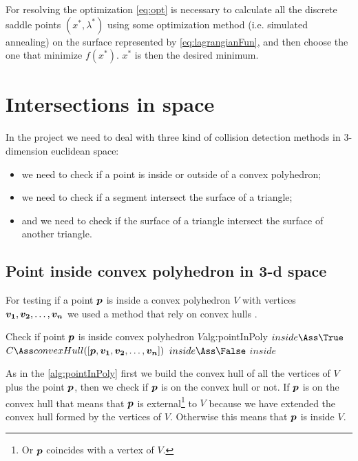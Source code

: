 \documentclass[dissertation.tex]{subfiles}
\begin{document}
For resolving the optimization \cref{eq:opt} is necessary to
calculate all the discrete saddle points $(x^*,\lambda^*)$ using some
optimization method (i.e. simulated annealing) on the surface
represented by
\cref{eq:lagrangianFun}, and then choose
the one that minimize $f(x^*)$. $x^*$ is then the desired minimum.

\section{Intersections in space}\label{sec:intersections}
In the project we need to deal with three kind of collision detection
methods in 3-dimension euclidean space:
\begin{itemize}
\item we need to check if a point is inside or outside
  of a convex polyhedron;
\item we need to check if a segment intersect the
  surface of a triangle;
\item and we need to check if the surface of a
  triangle intersect the surface of another triangle.
\end{itemize}

\subsection{Point inside convex polyhedron in 3-d space}
For testing if a point $\boldsymbol{p}$ is inside a convex polyhedron $V$ with
vertices $\boldsymbol{v_1},\boldsymbol{v_2},\dots,\boldsymbol{v_n}$ we used a method that rely
on convex hulls \cite{deberg}\cite{schneider}.

\begin{algo}{Check if point $\boldsymbol{p}$ is inside convex polyhedron $V$}{alg:pointInPoly}
  \State $inside\Ass\True$
  \State $C\Ass convexHull([\ve{p},\ve{v_1},\ve{v_2},\dots,\ve{v_n}])$
  \label{ln:pointInPolyFor}
  \State $inside\Ass\False$
  \State \Break
  \EndIf
  \EndFor
  \State\Return $inside$
  \EndFunction
\end{algo}
As in the \cref{alg:pointInPoly} first we build the convex hull of all
the vertices of $V$ plus the point $\boldsymbol{p}$, then we check if $\boldsymbol{p}$
is on the convex hull or not. If $\boldsymbol{p}$ is on the convex hull that
means that $\boldsymbol{p}$ is external\footnote{Or $\boldsymbol{p}$ coincides with a
  vertex of $V$.} to $V$ because we have extended the convex hull
formed by the vertices of $V$. Otherwise this means that $\boldsymbol{p}$ is
inside $V$.
\end{document}

